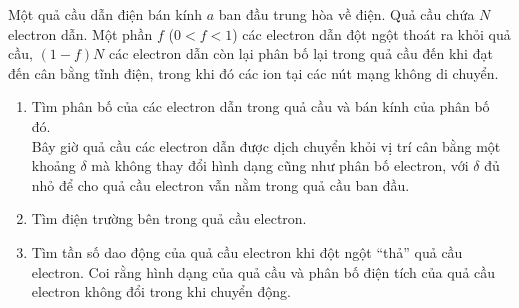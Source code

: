      \begin{vd}
    Một quả cầu dẫn điện bán kính $a$ ban đầu trung hòa về điện. Quả cầu chứa $N$ electron dẫn. Một phần $f$ ($0<f<1$) các electron dẫn đột ngột thoát ra khỏi quả cầu, $(1-f)N$ các electron dẫn còn lại phân bố lại trong quả cầu đến khi đạt đến cân bằng tĩnh điện, trong khi đó các ion tại các nút mạng không di chuyển.
    \begin{enumerate}[1)]
    \setlength{\itemsep}{0pt}
        \item Tìm phân bố của các electron dẫn trong quả cầu và bán kính của phân bố đó.\\
         Bây giờ quả cầu các electron dẫn được dịch chuyển khỏi vị trí cân bằng một khoảng $\delta$ mà không thay đổi hình dạng cũng như phân bố electron, với $\delta$ đủ nhỏ để cho quả cầu electron vẫn nằm trong quả cầu ban đầu.
        \item Tìm điện trường bên trong quả cầu electron.
        \item Tìm tần số dao động của quả cầu electron khi đột ngột ``thả'' quả cầu electron. Coi rằng hình dạng của quả cầu và phân bố điện tích của quả cầu electron không đổi trong khi chuyển động.
    \end{enumerate}
    \end{vd}
